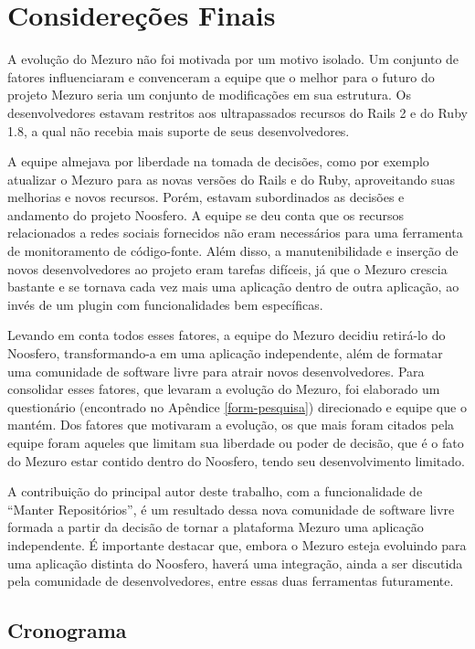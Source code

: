 \chapter{Considereções Finais}

A evolução do Mezuro não foi motivada por um motivo isolado. Um conjunto de fatores influenciaram e convenceram a equipe que o melhor para o futuro do projeto Mezuro seria um conjunto de modificações em sua estrutura. Os desenvolvedores estavam restritos aos ultrapassados recursos do Rails 2 e do Ruby 1.8, a qual não recebia mais suporte de seus desenvolvedores.

A equipe almejava por liberdade na tomada de decisões, como por exemplo atualizar o Mezuro para as novas versões do Rails e do Ruby, aproveitando suas melhorias e novos recursos. Porém, estavam subordinados as decisões e andamento do projeto Noosfero. A equipe se deu conta que os recursos relacionados a redes sociais fornecidos não eram necessários para uma ferramenta de monitoramento de código-fonte. Além disso, a manutenibilidade e inserção de novos desenvolvedores ao projeto eram tarefas difíceis, já que o Mezuro crescia bastante e se tornava cada vez mais uma aplicação dentro de outra aplicação, ao invés de um plugin com funcionalidades bem específicas.

Levando em conta todos esses fatores, a equipe do Mezuro decidiu retirá-lo do Noosfero, transformando-a em uma aplicação independente, além de formatar uma comunidade de software livre para atrair novos desenvolvedores. Para consolidar esses fatores, que levaram a evolução do Mezuro, foi elaborado um questionário (encontrado no Apêndice \ref{form-pesquisa}) direcionado e equipe que o mantém. Dos fatores que motivaram a evolução, os que mais foram citados pela equipe foram aqueles que limitam sua liberdade ou poder de decisão, que é o fato do Mezuro estar contido dentro do Noosfero, tendo seu desenvolvimento limitado.

A contribuição do principal autor deste trabalho, com a funcionalidade de   ``Manter Repositórios'', é um resultado dessa nova comunidade de software livre formada a partir da decisão de tornar a plataforma Mezuro uma aplicação independente. É importante destacar que, embora o Mezuro esteja evoluindo para uma aplicação distinta do Noosfero, haverá uma integração, ainda a ser discutida pela comunidade de desenvolvedores, entre essas duas ferramentas futuramente.

\section{Cronograma}

